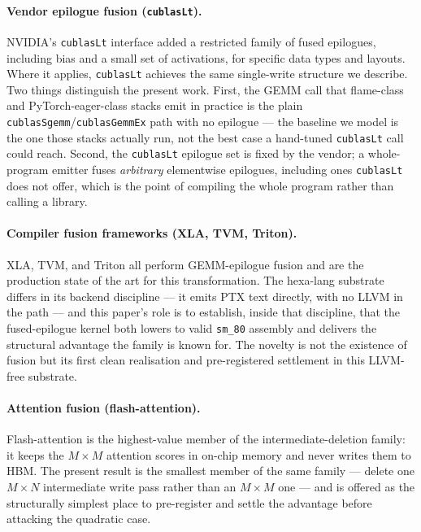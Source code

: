 \documentclass[11pt,a4paper]{article}
\begin{document}
\paragraph{Vendor epilogue fusion (\texttt{cublasLt}).}
NVIDIA's \texttt{cublasLt} interface added a restricted family of fused
epilogues, including bias and a small set of activations, for specific data
types and layouts. Where it applies, \texttt{cublasLt} achieves the same
single-write structure we describe. Two things distinguish the present work.
First, the GEMM call that flame-class and PyTorch-eager-class stacks emit in
practice is the plain \texttt{cublasSgemm}/\texttt{cublasGemmEx} path with no
epilogue --- the baseline we model is the one those stacks actually run, not
the best case a hand-tuned \texttt{cublasLt} call could reach. Second, the
\texttt{cublasLt} epilogue set is fixed by the vendor; a whole-program emitter
fuses \emph{arbitrary} elementwise epilogues, including ones \texttt{cublasLt}
does not offer, which is the point of compiling the whole program rather than
calling a library.

\paragraph{Compiler fusion frameworks (XLA, TVM, Triton).}
XLA, TVM, and Triton all perform GEMM-epilogue fusion and are the production
state of the art for this transformation. The hexa-lang substrate differs in
its backend discipline --- it emits PTX text directly, with no LLVM in the
path --- and this paper's role is to establish, inside that discipline, that
the fused-epilogue kernel both lowers to valid \texttt{sm\_80} assembly and
delivers the structural advantage the family is known for. The novelty is not
the existence of fusion but its first clean realisation and pre-registered
settlement in this LLVM-free substrate.

\paragraph{Attention fusion (flash-attention).}
Flash-attention is the highest-value member of the intermediate-deletion
family: it keeps the $M\times M$ attention scores in on-chip memory and never
writes them to HBM. The present result is the smallest member of the same
family --- delete one $M\times N$ intermediate write pass rather than an
$M\times M$ one --- and is offered as the structurally simplest place to
pre-register and settle the advantage before attacking the quadratic case.
\end{document}
